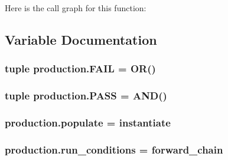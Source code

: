 Here is the call graph for this function\+:




\subsection{Variable Documentation}
\hypertarget{namespaceproduction_a991cfbd6401d50899210e7c488c52958}{}
\subsubsection[{F\+A\+I\+L}]{\setlength{\rightskip}{0pt plus 5cm}tuple production.\+F\+A\+I\+L = {\bf O\+R}()}\label{namespaceproduction_a991cfbd6401d50899210e7c488c52958}
\hypertarget{namespaceproduction_ae689947c217c2bf52c209776290f6c0d}{}
\subsubsection[{P\+A\+S\+S}]{\setlength{\rightskip}{0pt plus 5cm}tuple production.\+P\+A\+S\+S = {\bf A\+N\+D}()}\label{namespaceproduction_ae689947c217c2bf52c209776290f6c0d}
\hypertarget{namespaceproduction_a751c158cea5246ee2fdb8397fe36195c}{}
\subsubsection[{populate}]{\setlength{\rightskip}{0pt plus 5cm}production.\+populate = {\bf instantiate}}\label{namespaceproduction_a751c158cea5246ee2fdb8397fe36195c}
\hypertarget{namespaceproduction_aa5049c71dca019f1e7a7dd7d46231426}{}
\subsubsection[{run\+\_\+conditions}]{\setlength{\rightskip}{0pt plus 5cm}production.\+run\+\_\+conditions = {\bf forward\+\_\+chain}}\label{namespaceproduction_aa5049c71dca019f1e7a7dd7d46231426}
